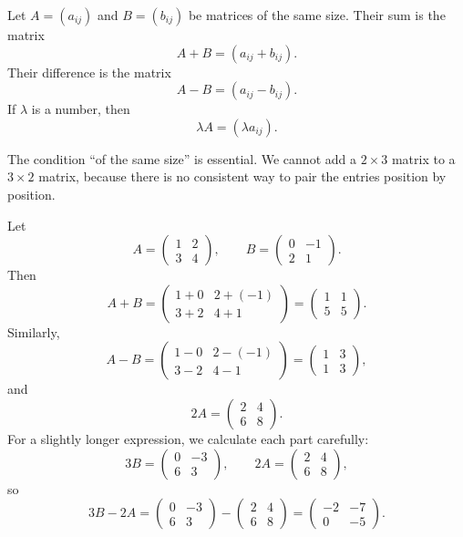 \begin{definitionbox}
Let \(A=(a_{ij})\) and \(B=(b_{ij})\) be matrices of the same size. Their sum is the matrix
\[
A+B=(a_{ij}+b_{ij}).
\]
Their difference is the matrix
\[
A-B=(a_{ij}-b_{ij}).
\]
If \(\lambda\) is a number, then
\[
\lambda A=(\lambda a_{ij}).
\]
\end{definitionbox}

The condition ``of the same size'' is essential. We cannot add a \(2\times 3\) matrix to a \(3\times 2\) matrix, because there is no consistent way to pair the entries position by position.

\begin{examplebox}
Let
\[
A=\begin{pmatrix}1 & 2\\ 3 & 4\end{pmatrix},
\qquad
B=\begin{pmatrix}0 & -1\\ 2 & 1\end{pmatrix}.
\]
Then
\[
A+B=
\begin{pmatrix}
1+0 & 2+(-1)\\
3+2 & 4+1
\end{pmatrix}
=
\begin{pmatrix}
1 & 1\\
5 & 5
\end{pmatrix}.
\]
Similarly,
\[
A-B=
\begin{pmatrix}
1-0 & 2-(-1)\\
3-2 & 4-1
\end{pmatrix}
=
\begin{pmatrix}
1 & 3\\
1 & 3
\end{pmatrix},
\]
and
\[
2A=
\begin{pmatrix}
2 & 4\\
6 & 8
\end{pmatrix}.
\]
For a slightly longer expression, we calculate each part carefully:
\[
3B=\begin{pmatrix}0 & -3\\ 6 & 3\end{pmatrix},
\qquad
2A=\begin{pmatrix}2 & 4\\ 6 & 8\end{pmatrix},
\]
so
\[
3B-2A=
\begin{pmatrix}0 & -3\\ 6 & 3\end{pmatrix}
-
\begin{pmatrix}2 & 4\\ 6 & 8\end{pmatrix}
=
\begin{pmatrix}-2 & -7\\ 0 & -5\end{pmatrix}.
\]
\end{examplebox}

